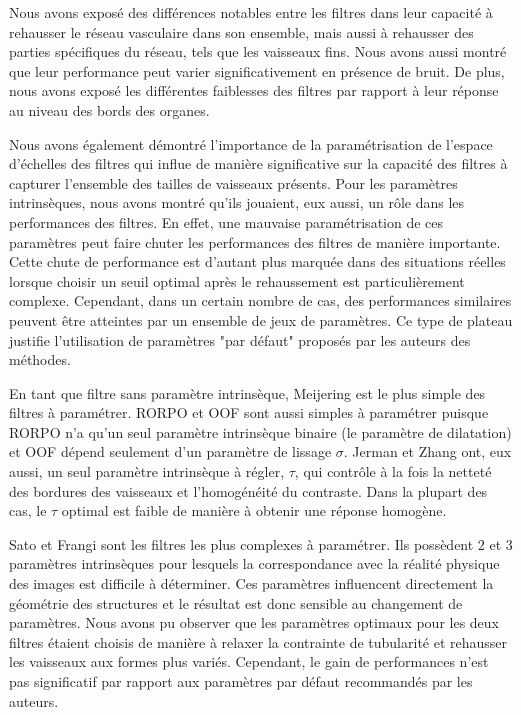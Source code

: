 Nous avons exposé des différences notables entre les filtres dans leur capacité à rehausser le réseau vasculaire dans son ensemble, mais aussi à rehausser des parties spécifiques du réseau, tels que les vaisseaux fins. Nous avons aussi montré que leur performance peut varier significativement en présence de bruit. De plus, nous avons exposé les différentes faiblesses des filtres par rapport à leur réponse au niveau des bords des organes.

Nous avons également démontré l'importance de la paramétrisation de l'espace d'échelles des filtres qui influe de manière significative sur la capacité des filtres à capturer l'ensemble des tailles de vaisseaux présents. Pour les paramètres intrinsèques, nous avons montré qu'ils jouaient, eux aussi, un rôle dans les performances des filtres. En effet, une mauvaise paramétrisation de ces paramètres peut faire chuter les performances des filtres de manière importante. Cette chute de performance est d'autant plus marquée dans des situations réelles lorsque choisir un seuil optimal après le rehaussement est particulièrement complexe. Cependant, dans un certain nombre de cas, des performances similaires peuvent être atteintes par un ensemble de jeux de paramètres. Ce type de plateau justifie l'utilisation de paramètres "par défaut" proposés par les auteurs des méthodes.   

En tant que filtre sans paramètre intrinsèque, Meijering est le plus simple des filtres à paramétrer. RORPO et OOF sont aussi simples à paramétrer puisque RORPO n'a qu'un seul paramètre intrinsèque binaire (le paramètre de dilatation) et OOF dépend seulement d'un paramètre de lissage $\sigma$. Jerman et Zhang ont, eux aussi, un seul paramètre intrinsèque à régler, $\tau$, qui contrôle à la fois la netteté des bordures des vaisseaux et l'homogénéité du contraste. Dans la plupart des cas, le $\tau$ optimal est faible de manière à obtenir une réponse homogène. 

Sato et Frangi sont les filtres les plus complexes à paramétrer. Ils possèdent $2$ et $3$ paramètres intrinsèques pour lesquels la correspondance avec la réalité physique des images est difficile à déterminer. Ces paramètres influencent directement la géométrie des structures et le résultat est donc sensible au changement de paramètres. Nous avons pu observer que les paramètres optimaux pour les deux filtres étaient choisis de manière à relaxer la contrainte de tubularité et rehausser les vaisseaux aux formes plus variés. Cependant, le gain de performances n'est pas significatif par rapport aux paramètres par défaut recommandés par les auteurs.

